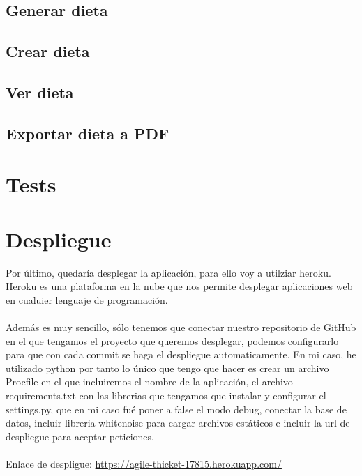 \subsection{Generar dieta}
\subsection{Crear dieta}
\subsection{Ver dieta}
\subsection{Exportar dieta a PDF}

\section{Tests}

\section{Despliegue}

Por último, quedaría desplegar la aplicación, para ello voy a utilziar heroku.
Heroku es una plataforma en la nube que nos permite desplegar aplicaciones web en cualuier lenguaje de programación.
\\\\
Además es muy sencillo, sólo tenemos que conectar nuestro repositorio de GitHub en el que tengamos el proyecto que queremos desplegar,
podemos configurarlo para que con cada commit se haga el despliegue automaticamente.
En mi caso, he utilizado python por tanto lo único que tengo que hacer es crear un archivo Procfile en el que incluiremos el nombre de la aplicación,
el archivo requirements.txt con las librerias que tengamos que instalar y configurar el settings.py, que en mi caso fué poner a false el modo debug, conectar la base de datos,
incluir libreria whitenoise para cargar archivos estáticos e incluir la url de despliegue para aceptar peticiones.
\\\\
Enlace de despligue:
\url{https://agile-thicket-17815.herokuapp.com/}